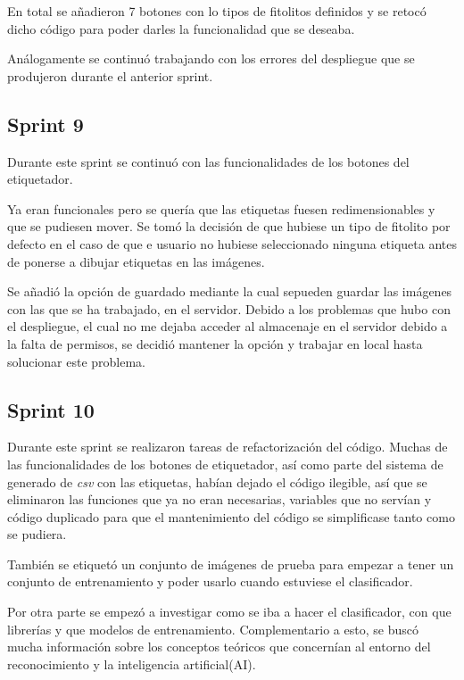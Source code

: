 En total se añadieron 7 botones con lo tipos de fitolitos definidos y se retocó dicho código para poder darles la funcionalidad que se deseaba.

Análogamente se continuó trabajando con los errores del despliegue que se produjeron durante el anterior sprint.


\subsection{Sprint 9}

Durante este sprint se continuó con las funcionalidades de los botones del etiquetador.

Ya eran funcionales pero se quería que las etiquetas fuesen redimensionables y que se pudiesen mover.
Se tomó la decisión de que hubiese un tipo de fitolito por defecto en el caso de que e usuario no hubiese seleccionado ninguna etiqueta antes de ponerse a dibujar etiquetas en las imágenes.

Se añadió la opción de guardado mediante la cual sepueden guardar las imágenes con las que se ha trabajado, en el servidor. Debido a los problemas que hubo con el despliegue, el cual no me dejaba acceder al almacenaje en el servidor debido a la falta de permisos, se decidió mantener la opción y trabajar en local hasta solucionar este problema.



\subsection{Sprint 10}

Durante este sprint se realizaron tareas de refactorización del código. Muchas de las funcionalidades de los botones de etiquetador, así como parte del sistema de generado de \textit{csv} con las etiquetas, habían dejado el código ilegible, así que se eliminaron las funciones que ya no eran necesarias, variables que no servían y código duplicado para que el mantenimiento del código se simplificase tanto como se pudiera.

También se etiquetó un conjunto de imágenes de prueba para empezar a tener un conjunto de entrenamiento y poder usarlo cuando estuviese el clasificador.

Por otra parte se empezó a investigar como se iba a hacer el clasificador, con que librerías y que modelos de entrenamiento. Complementario a esto, se buscó mucha información sobre los conceptos teóricos que concernían al entorno del reconocimiento y la inteligencia artificial(AI).



